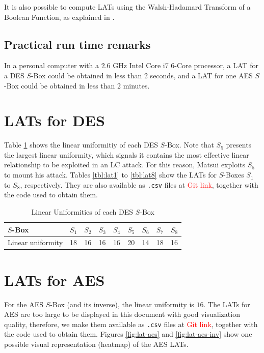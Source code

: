 \documentclass{report}
\begin{document}
It is also possible to compute LATs using the Walsh-Hadamard Transform of a Boolean Function, as explained in \cite{Anne2016}.

\subsection{Practical run time remarks}
In a personal computer with a 2.6 GHz Intel Core i7 6-Core processor, a LAT for a DES $S$-Box could be obtained in less than 2 seconds, and a LAT for one AES $S$-Box could be obtained in less than 2 minutes.

\section{LATs for DES}

Table \ref{tbl:lu-des} shows the linear uniformitiy of each DES $S$-Box. Note that $S_5$ presents the largest linear uniformity, which signals it contains the most effective linear relationship to be exploited in an LC attack. For this reason, Matsui \cite{Matsui1993LinearCM} exploits $S_5$ to mount his attack.
Tables \ref{tbl:lat1} to \ref{tbl:lat8} show the LATs for $S$-Boxes $S_1$ to $S_8$, respectively. They are also available as \texttt{.csv} files at \textcolor{red}{Git link}, together with the code used to obtain them.

\begin{table}[H]
\centering
\begin{tabular}{|l|l|l|l|l|l|l|l|l|}
\hline
$S$-Box           & $S_1$ & $S_2$ & $S_3$ & $S_4$ & $S_5$ & $S_6$ & $S_7$ & $S_8$ \\ \hline
Linear uniformity & 18    & 16    & 16    & 16    & 20    & 14    & 18    & 16    \\ \hline
\end{tabular}
\caption{Linear Uniformities of each DES $S$-Box}
\label{tbl:lu-des}
\end{table}










\section{LATs for AES}

For the AES $S$-Box (and its inverse), the linear uniformity is $16$. The LATs for AES are too large to be displayed in this document with good visualization quality, therefore, we make them available as \texttt{.csv} files at \textcolor{red}{Git link}, together with the code used to obtain them. Figures \ref{fig:lat-aes} and \ref{fig:lat-aes-inv} show one possible visual representation (heatmap) of the AES LATs.
\end{document}
